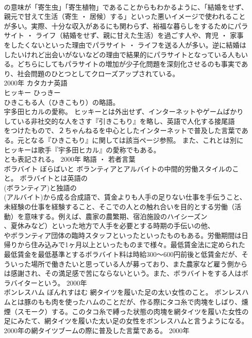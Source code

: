 \documentclass[8pt]{extreport}
\begin{document}
\begin{CJK}{UTF8}{min}
\\	の意味が「寄生虫」「寄生植物」であることからもわかるように、「結婚をせず、親元で甘えて生活（寄生 ・ 居候）する」といった悪いイメージで使われることが多い。実際、十分な収入があるにも関わらず、裕福な暮らしをするためにパラサイト ・ ライフ（結婚をせず、親に甘えた生活）を過ごす人や、育児 ・ 家事をしたくないといった理由でパラサイト ・ ライフを送る人が多い。逆に結婚はしたいけれど出会いがないなどの理由で結果的にパラサイトとなっている人もいる。どちらにしてもパラサイトの増加が少子化問題を深刻化させるのも事実であり、社会問題のひとつとしてクローズアップされている。
\\	2000年	カタカナ英語	
\\	ヒッキー	ひっきー	
\\	ひきこもる人（ひきこもり）の略語。 
\\	宇多田ヒカルの愛称。	ヒッキーとは外出せず、インターネットやゲームばかりしている非社交的な人をさす『引きこもり』を略し、英語で人化する接尾語
\\	をつけたもので、２ちゃんねるを中心としたインターネットで普及した言葉である。元となる『ひきこもり』に関しては該当ページ参照。 また、これとは別にヒッキーは歌手『宇多田ヒカル』の愛称でもある。
\\	とも表記される。	2000年	略語 ・ 若者言葉	
\\	ボラバイト	ぼらばいと	ボランティアとアルバイトの中間的労働スタイルのこと。	ボラバイトとは英語の
\\	(ボランティア)と独語の
\\	(アルバイト)から成る合成語で、賃金よりも人手の足りない仕事を手伝うこと、未経験の仕事を経験すること、そこでの人との触れ合いを目的とする労働（活動）を意味する。例えば、農家の農繁期、宿泊施設のハイシーズン
\\	、夏休みなど）といった地方で人手を必要とする時期の手伝いの他、
\\	やボランティア団体の臨時スタッフといったといったものもある。労働期間は日帰りから住み込みで1ヶ月以上といったものまで様々。最低賃金法に定められた最低賃金を最低基準とするボラバイト料は時給300～600円前後と低賃金だが、そういった場所で働きたいと思っている人が募っており、また農家など雇う側からは感謝され、その満足感で苦にならないという。また、ボラバイトをする人はボラバイターという。	2000年	
\\	ボンレスハム	ぼんれすはむ	網タイツを履いた足の太い女性のこと。	ボンレスハムとは豚のもも肉を使ったハムのことだが、作る際にタコ糸で肉塊をしばり、燻煙（スモーク）する。このタコ糸で縛った状態の肉塊を網タイツを履いた女性の足にみたて、網タイツを履いた太い足の女性をボンレスハムと言うようになる。2000年の網タイツブームの際に普及した言葉である。	2000年	

\end{CJK}
\end{document}

